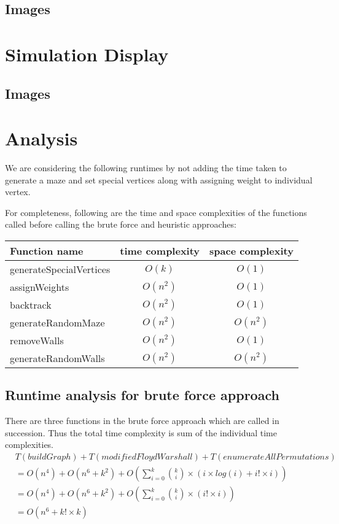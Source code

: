 \documentclass[12pt]{report}
\begin{document}
\section{Images} %

\chapter{Simulation Display} %
\section{Images}


\chapter{Analysis} %
We are considering the following runtimes by not adding the time taken to generate a maze and set special vertices along with assigning weight to individual vertex.\par
For completeness, following are the time and space complexities of the functions called before calling the brute force and heuristic approaches:

\begin{center}
\begin{tabular}{ |l||c|c| } 
 \hline
 Function name & time complexity &space complexity \\ 
 \hline\hline
 generateSpecialVertices & $O(k)$  & $O(1)$\\
 \hline
 assignWeights & $O(n^2)$& $O(1)$\\ 
 \hline
 backtrack & $O(n^2)$  & $O(1)$\\
 \hline
 generateRandomMaze & $O(n^2)$ & $O(n^2)$ \\ 
 \hline
 removeWalls & $O(n^2)$ & $O(1)$\\ %
 \hline
 generateRandomWalls & $O(n^2)$ & $O(n^2)$ \\ %
 \hline
 
\end{tabular}
\end{center}


\section{Runtime analysis for brute force approach}
There are three functions in the brute force approach which are called in succession. Thus the total time complexity is sum of the individual time complexities.
\begin{equation}
\begin{aligned}
    &T({buildGraph}) + T({modifiedFloydWarshall}) + T({enumerateAllPermutations})\\
    &= O(n^4) + O(n^6 + k^2) + O(\sum_{i=0}^{k}{\binom{k}{i}\times(i\times log(i) + i!\times i)})\\
    &= O(n^4) + O(n^6 + k^2) + O(\sum_{i=0}^{k}{\binom{k}{i}\times(i!\times i)})\\
    &= O(n^6 + k! \times k)
\end{aligned}
\end{equation}
\end{document}

